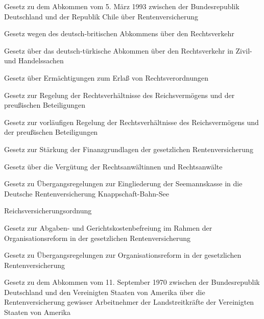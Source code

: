 \item[{RVChilAbkG}] Gesetz zu dem Abkommen vom 5. März 1993 zwischen der Bundesrepublik Deutschland und der Republik Chile über Rentenversicherung

\item[{RVerkAbkGBRG}] Gesetz wegen des deutsch-britischen Abkommens über den Rechtsverkehr

\item[{RVerkAbkTURG}] Gesetz über das deutsch-türkische Abkommen über den Rechtsverkehr in Zivil- und Handelssachen

\item[{RVErmäG}] Gesetz über Ermächtigungen zum Erlaß von Rechtsverordnungen

\item[{RVermG}] Gesetz zur Regelung der Rechtsverhältnisse des Reichsvermögens und der preußischen Beteiligungen

\item[{RVermVG}] Gesetz zur vorläufigen Regelung der Rechtsverhältnisse des Reichsvermögens und der preußischen Beteiligungen

\item[{RVFinanzG}] Gesetz zur Stärkung der Finanzgrundlagen der gesetzlichen Rentenversicherung

\item[{RVG}] Gesetz über die Vergütung der Rechtsanwältinnen und Rechtsanwälte

\item[{RVKnSeemannskasseÜG}] Gesetz zu Übergangsregelungen zur Eingliederung der Seemannskasse in die Deutsche Rentenversicherung Knappschaft-Bahn-See

\item[{RVO}] Reichsversicherungsordnung

\item[{RVOrgRefBefrG}] Gesetz zur Abgaben- und Gerichtskostenbefreiung im Rahmen der Organisationsreform in der gesetzlichen Rentenversicherung

\item[{RVOrgRefÜG}] Gesetz zu Übergangsregelungen zur Organisationsreform in der gesetzlichen Rentenversicherung

\item[{RVStreitkrAbkUSAG}] Gesetz zu dem Abkommen vom 11. September 1970 zwischen der Bundesrepublik Deutschland und den Vereinigten Staaten von Amerika über die Rentenversicherung gewisser Arbeitnehmer der Landstreitkräfte der Vereinigten Staaten von Amerika

